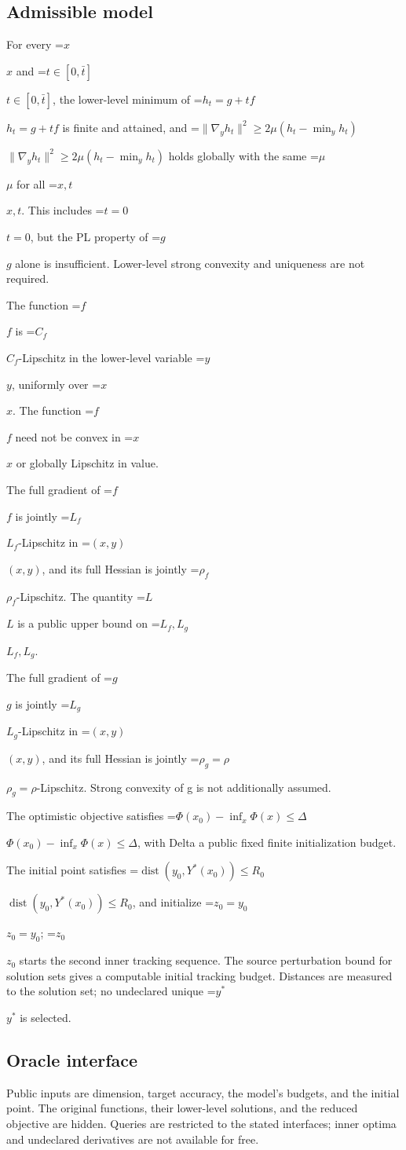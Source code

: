 \documentclass[10pt,a4paper]{article}
\newcommand{\AtlasMath}[1]{\par\begingroup\centering\setbox0=\hbox{$\displaystyle #1$}\ifdim\wd0>1.4\linewidth\typeout{ATLAS WIDE FORMULA: \the\wd0}\fi\ifdim\wd0>\linewidth\resizebox{\linewidth}{!}{\box0}\else\box0\fi\par\endgroup}
\newcommand{\AtlasInlineMath}[1]{\begingroup\setbox0=\hbox{$#1$}\ifdim\wd0>.4\linewidth\endgroup\AtlasMath{#1}\else\endgroup$#1$\fi}
\begin{document}
\subsection{Admissible model}
For every \AtlasInlineMath{x} and \AtlasInlineMath{t\in[0,\bar t]}, the lower-level minimum of \AtlasInlineMath{h_t=g+tf} is finite and attained, and \AtlasInlineMath{\|\nabla_yh_t\|^2\ge2\mu(h_t-\min_yh_t)} holds globally with the same \AtlasInlineMath{\mu} for all \AtlasInlineMath{x,t}. This includes \AtlasInlineMath{t=0}, but the PL property of \AtlasInlineMath{g} alone is insufficient. Lower-level strong convexity and uniqueness are not required.

The function \AtlasInlineMath{f} is \AtlasInlineMath{C_f}-Lipschitz in the lower-level variable \AtlasInlineMath{y}, uniformly over \AtlasInlineMath{x}. The function \AtlasInlineMath{f} need not be convex in \AtlasInlineMath{x} or globally Lipschitz in value.

The full gradient of \AtlasInlineMath{f} is jointly \AtlasInlineMath{L_f}-Lipschitz in \AtlasInlineMath{(x,y)}, and its full Hessian is jointly \AtlasInlineMath{\rho_f}-Lipschitz. The quantity \AtlasInlineMath{L} is a public upper bound on \AtlasInlineMath{L_f,L_g}.

The full gradient of \AtlasInlineMath{g} is jointly \AtlasInlineMath{L_g}-Lipschitz in \AtlasInlineMath{(x,y)}, and its full Hessian is jointly \AtlasInlineMath{\rho_g=\rho}-Lipschitz. Strong convexity of g is not additionally assumed.

The optimistic objective satisfies \AtlasInlineMath{\Phi(x_0)-\inf_x\Phi(x)\le\Delta}, with Delta a public fixed finite initialization budget.

The initial point satisfies \AtlasInlineMath{\operatorname{dist}(y_0,Y^*(x_0))\le R_0}, and initialize \AtlasInlineMath{z_0=y_0}; \AtlasInlineMath{z_0} starts the second inner tracking sequence. The source perturbation bound for solution sets gives a computable initial tracking budget. Distances are measured to the solution set; no undeclared unique \AtlasInlineMath{y^*} is selected.

\subsection{Oracle interface}
Public inputs are dimension, target accuracy, the model's budgets, and the initial point. The original functions, their lower-level solutions, and the reduced objective are hidden. Queries are restricted to the stated interfaces; inner optima and undeclared derivatives are not available for free.
\end{document}
